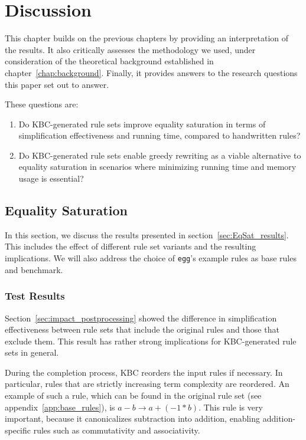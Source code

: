 \chapter{Discussion}
\label{chap:discussion}
This chapter builds on the previous chapters by providing an interpretation of the results. It also critically assesses the methodology we used, under consideration of the theoretical background established in chapter~\ref{chap:background}. Finally, it provides answers to the research questions this paper set out to answer.

These questions are:
\begin{enumerate}
	\item Do KBC-generated rule sets improve equality saturation in terms of simplification effectiveness and running time, compared to handwritten rules?
	\item Do KBC-generated rule sets enable greedy rewriting as a viable alternative to equality saturation in scenarios where minimizing running time and memory usage is essential?
\end{enumerate}

\section{Equality Saturation}
In this section, we discuss the results presented in section~\ref{sec:EqSat_results}. This includes the effect of different rule set variants and the resulting implications. We will also address the choice of \texttt{egg}'s example rules as base rules and benchmark.

\subsection{Test Results}
Section~\ref{sec:impact_postprocessing} showed the difference in simplification effectiveness between rule sets that include the original rules and those that exclude them. This result has rather strong implications for KBC-generated rule sets in general. 

During the completion process, KBC reorders the input rules if necessary. In particular, rules that are strictly increasing term complexity are reordered. An example of such a rule, which can be found in the original rule set (see appendix~\ref{app:base_rules}), is $a - b \to a + (-1 * b)$. This rule is very important, because it canonicalizes subtraction into addition, enabling addition-specific rules such as commutativity and associativity.

